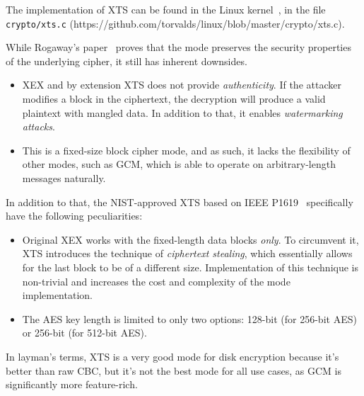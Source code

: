 The implementation of XTS can be found in the Linux kernel~\cite{linux-kernel}, in the file \texttt{crypto/xts.c} (https://github.com/torvalds/linux/blob/master/crypto/xts.c).

While Rogaway's paper~\cite{Rogaway} proves that the mode preserves the security properties of the underlying cipher, it still has inherent downsides.

\begin{itemize}
    \item XEX and by extension XTS does not provide \textit{authenticity}. If the attacker modifies a block in the ciphertext, the decryption will produce a valid plaintext with mangled data. In addition to that, it enables \textit{watermarking attacks}.
    \item This is a fixed-size block cipher mode, and as such, it lacks the flexibility of other modes, such as GCM, which is able to operate on arbitrary-length messages naturally.
\end{itemize}

In addition to that, the NIST-approved XTS based on IEEE P1619~\cite{IEEE1619} specifically have the following peculiarities:
\begin{itemize}
    \item Original XEX works with the fixed-length data blocks \textit{only}.
    To circumvent it, XTS introduces the technique of \textit{ciphertext stealing}, which essentially allows for the last block to be of a different size.
    Implementation of this technique is non-trivial and increases the cost and complexity of the mode implementation.
    \item The AES key length is limited to only two options: 128-bit (for 256-bit AES) or 256-bit (for 512-bit AES).
\end{itemize}

In layman's terms, XTS is a very good mode for disk encryption because it's better than raw CBC, but it's not the best mode for all use cases, as GCM is significantly more feature-rich.
